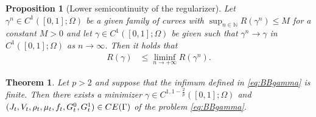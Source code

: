 \documentclass[10pt,a4paper]{amsart}
\newtheorem{theorem}{Theorem}
\newtheorem{proposition}{Proposition}
\begin{document}
\begin{proposition}[Lower semicontinuity of the regularizer]\label{LowSemiCont}
    Let $\gamma^n\in C^{1}([0,1];\Omega)$ be a given family of curves with $\sup_{n\in \mathbb{N}}R(\gamma^n)\leq M$ for a constant $M>0$ and let $\gamma\in C^{1}([0,1];\Omega)$ be given such that $\gamma^n\to\gamma$ in $C^{1}([0,1];\Omega)$ as $n\to\infty$. Then it holds that
    \begin{align*}
        R(\gamma) &\leq \liminf\limits_{n\to+\infty} R(\gamma^n).
    \end{align*}
\end{proposition}

\begin{theorem}\label{thm:compn}
    Let $p>2$ and suppose that the infimum defined in \eqref{eq:BBgamma} is finite. Then there exists a minimizer $\gamma \in C^{1, 1 - \frac{2}{p}}([0,1];\Omega)$ and $(J_t, V_t, \rho_t, \mu_t, f_t, G^0_t, G^1_t) \in {\rm CE}(\Gamma)$ of the problem \eqref{eq:BBgamma}.
\end{theorem}
\end{document}
